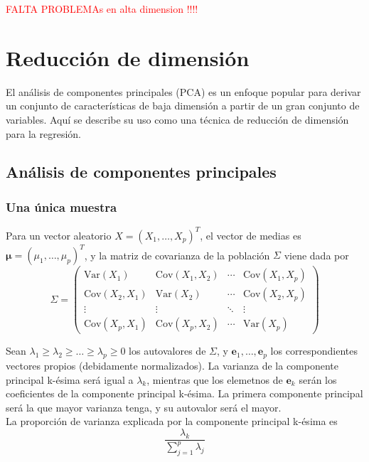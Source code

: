 \textcolor{red}{FALTA PROBLEMAs en alta dimension !!!!}

\section{Reducción de dimensión}

El análisis de componentes principales (PCA) es un enfoque popular para derivar un conjunto de características de baja dimensión a partir de un gran conjunto de variables. Aquí se describe su uso como una técnica de reducción de dimensión para la regresión.

\subsection{Análisis de componentes principales}

\subsubsection{Una única muestra}

Para un vector aleatorio $X = (X_1, \dots, X_p)^T$, el vector de medias es $\boldsymbol{\mu} = (\mu_1, \dots, \mu_p)^T$, y la matriz de covarianza de la población $\Sigma$ viene dada por 
\begin{equation}
\Sigma = \begin{pmatrix}
\text{Var}(X_1) & \text{Cov}(X_1, X_2) & \cdots & \text{Cov}(X_1, X_p) \\
\text{Cov}(X_2, X_1) & \text{Var}(X_2) & \cdots & \text{Cov}(X_2, X_p) \\
\vdots & \vdots & \ddots & \vdots \\
\text{Cov}(X_p, X_1) & \text{Cov}(X_p, X_2) & \cdots & \text{Var}(X_p)
\end{pmatrix}
\end{equation}

Sean $\lambda_1 \geq \lambda_2  \geq \dots \geq \lambda_p \geq 0$ los autovalores de $\Sigma$, y $\mathbf{e}_1, \dots, \mathbf{e}_p$ los correspondientes vectores propios (debidamente normalizados). La varianza de la componente principal k-ésima será igual a $\lambda_k$, mientras que los elemetnos de $\mathbf{e}_k$ serán los coeficientes de la componente principal k-ésima. La primera componente principal será la que mayor varianza tenga, y su autovalor será el mayor. \\

\noindent La proporción de varianza explicada por la componente principal k-ésima es 
\begin{equation}
\frac{\lambda_k}{\sum_{j=1}^p \lambda_j}
\end{equation}

